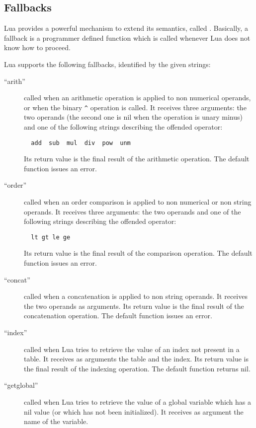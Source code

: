 \subsection{Fallbacks} \label{fallback}

Lua provides a powerful mechanism to extend its semantics,
called .
Basically, a fallback is a programmer defined function
which is called whenever Lua does not know how to proceed.

Lua supports the following fallbacks,
identified by the given strings:
\begin{description}
\item[``arith'']
called when an arithmetic operation is applied to non numerical operands,
or when the binary \verb'^' operation is called.
It receives three arguments:
the two operands (the second one is nil when the operation is unary minus)
and one of the following strings describing the offended operator:
\begin{verbatim}
  add  sub  mul  div  pow  unm
\end{verbatim}
Its return value is the final result of the arithmetic operation.
The default function issues an error.
\item[``order'']
called when an order comparison is applied to non numerical or
non string operands.
It receives three arguments:
the two operands and
one of the following strings describing the offended operator:
\begin{verbatim}
  lt gt le ge
\end{verbatim}
Its return value is the final result of the comparison operation.
The default function issues an error.
\item[``concat'']
called when a concatenation is applied to non string operands.
It receives the two operands as arguments.
Its return value is the final result of the concatenation operation.
The default function issues an error.
\item[``index'']
called when Lua tries to retrieve the value of an index
not present in a table.
It receives as arguments the table and the index.
Its return value is the final result of the indexing operation.
The default function returns nil.
\item[``getglobal'']
called when Lua tries to retrieve the value of a global variable
which has a nil value (or which has not been initialized).
It receives as argument the name of the variable.

\end{description}
